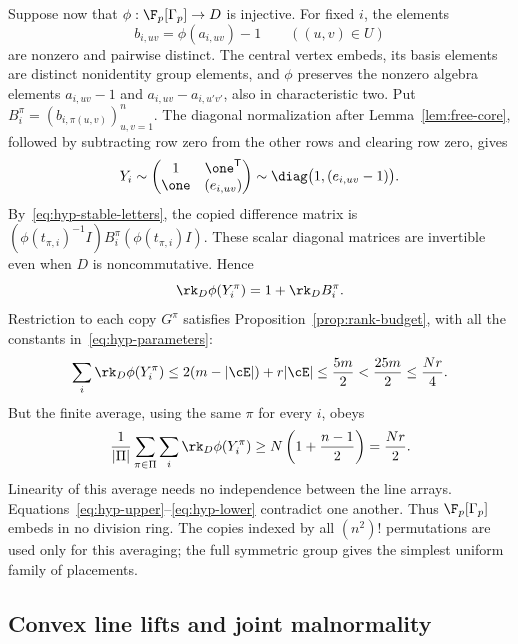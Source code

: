 Suppose now that \(\phi:\F_p[\Gamma_p]\to D\) is injective.
For fixed \(i\), the elements
\[
 b_{i,uv}=\phi(a_{i,uv})-1\qquad ((u,v)\in U)
\]
are nonzero and pairwise distinct. The central vertex embeds, its
basis elements are distinct nonidentity group elements, and \(\phi\)
preserves the nonzero algebra elements \(a_{i,uv}-1\) and
\(a_{i,uv}-a_{i,u'v'}\), also in characteristic two.
Put \(B_i^\pi=(b_{i,\pi(u,v)})_{u,v=1}^n\).
The diagonal normalization after Lemma~\ref{lem:free-core}, followed
by subtracting row zero from the other rows and clearing row zero,
gives
\[
 Y_i\sim\begin{pmatrix}1&\one^{\mathsf T}\\
                 \one&(e_{i,uv})\end{pmatrix}
       \sim\diag\bigl(1,(e_{i,uv}-1)\bigr).
\]
By~\eqref{eq:hyp-stable-letters}, the copied difference matrix is
\((\phi(t_{\pi,i})^{-1}I)B_i^\pi(\phi(t_{\pi,i})I)\).
These scalar diagonal matrices are invertible even when \(D\) is
noncommutative. Hence
\begin{equation}\label{eq:hyp-rank-match}
 \rk_D\phi(Y_i^\pi)=1+\rk_D B_i^\pi.
\end{equation}
Restriction to each copy \(G^\pi\) satisfies
Proposition~\ref{prop:rank-budget}, with all the constants
in~\eqref{eq:hyp-parameters}:
\begin{equation}\label{eq:hyp-upper}
 \sum_i\rk_D\phi(Y_i^\pi)
 \le2(m-|\cE|)+r|\cE|
 \le\frac{5m}{2}<\frac{25m}{2}\le\frac{Nr}{4}.
\end{equation}
But the finite average, using the same \(\pi\) for every \(i\), obeys
\begin{equation}\label{eq:hyp-lower}
 \frac1{|\Pi|}\sum_{\pi\in\Pi}\sum_i\rk_D\phi(Y_i^\pi)
 \ge N\left(1+\frac{n-1}{2}\right)=\frac{Nr}{2}.
\end{equation}
Linearity of this average needs no independence between the line
arrays. Equations~\eqref{eq:hyp-upper}--\eqref{eq:hyp-lower} contradict
one another. Thus \(\F_p[\Gamma_p]\) embeds in no division ring.
The copies indexed by all \((n^2)!\) permutations are used only for
this averaging; the full symmetric group gives the simplest uniform
family of placements.

\subsection{Convex line lifts and joint malnormality}

